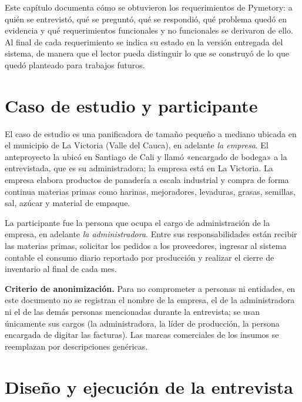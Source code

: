 
Este capítulo documenta cómo se obtuvieron los requerimientos de Pymetory: a quién se entrevistó, qué se preguntó, qué se respondió, qué problema quedó en evidencia y qué requerimientos funcionales y no funcionales se derivaron de ello. Al final de cada requerimiento se indica su estado en la versión entregada del sistema, de manera que el lector pueda distinguir lo que se construyó de lo que quedó planteado para trabajos futuros.

\section{Caso de estudio y participante}
\label{sec:req_caso}

El caso de estudio es una panificadora de tamaño pequeño a mediano ubicada en el municipio de La Victoria (Valle del Cauca), en adelante \textit{la empresa}. El anteproyecto la ubicó en Santiago de Cali y llamó «encargado de bodega» a la entrevistada, que es su administradora; la empresa está en La Victoria. La empresa elabora productos de panadería a escala industrial y compra de forma continua materias primas como harinas, mejoradores, levaduras, grasas, semillas, sal, azúcar y material de empaque.

La participante fue la persona que ocupa el cargo de administración de la empresa, en adelante \textit{la administradora}. Entre sus responsabilidades están recibir las materias primas, solicitar los pedidos a los proveedores, ingresar al sistema contable el consumo diario reportado por producción y realizar el cierre de inventario al final de cada mes.

\textbf{Criterio de anonimización.} Para no comprometer a personas ni entidades, en este documento no se registran el nombre de la empresa, el de la administradora ni el de las demás personas mencionadas durante la entrevista; se usan únicamente sus cargos (la administradora, la líder de producción, la persona encargada de digitar las facturas). Las marcas comerciales de los insumos se reemplazan por descripciones genéricas.

\section{Diseño y ejecución de la entrevista}
\label{sec:req_entrevista}


